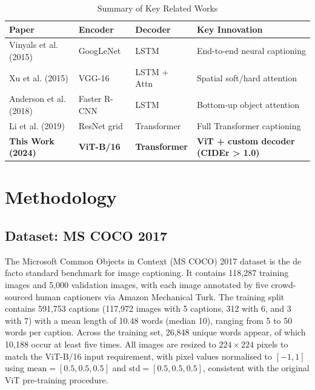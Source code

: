 \documentclass[conference]{IEEEtran}
\begin{document}
\begin{table}[htbp]
\caption{Summary of Key Related Works}
\label{tab:related_works}
\centering
\small
\begin{tabular}{@{}llll@{}}
\toprule
\textbf{Paper} & \textbf{Encoder} & \textbf{Decoder} & \textbf{Key Innovation} \\
\midrule
Vinyals et al. (2015) \cite{vinyals2015show} & GoogLeNet & LSTM & End-to-end neural captioning \\
Xu et al. (2015) \cite{xu2015show} & VGG-16 & LSTM + Attn & Spatial soft/hard attention \\
Anderson et al. (2018) \cite{anderson2018bottom} & Faster R-CNN & LSTM & Bottom-up object attention \\
Li et al. (2019) \cite{li2019visualbert} & ResNet grid & Transformer & Full Transformer captioning \\
\textbf{This Work (2024)} & \textbf{ViT-B/16} & \textbf{Transformer} & \textbf{ViT + custom decoder (CIDEr > 1.0)} \\
\bottomrule
\end{tabular}
\end{table}

\section{Methodology}

\subsection{Dataset: MS COCO 2017}
The Microsoft Common Objects in Context (MS COCO) 2017 dataset \cite{lin2014microsoft} is the de facto standard benchmark for image captioning. It contains 118,287 training images and 5,000 validation images, with each image annotated by five crowd-sourced human captioners via Amazon Mechanical Turk. The training split contains 591,753 captions (117,972 images with 5 captions, 312 with 6, and 3 with 7) with a mean length of 10.48 words (median 10), ranging from 5 to 50 words per caption. Across the training set, 26,848 unique words appear, of which 10,188 occur at least five times. All images are resized to $224 \times 224$ pixels to match the ViT-B/16 input requirement, with pixel values normalised to $[-1, 1]$ using $\text{mean} = [0.5, 0.5, 0.5]$ and $\text{std} = [0.5, 0.5, 0.5]$, consistent with the original ViT pre-training procedure.
\end{document}
